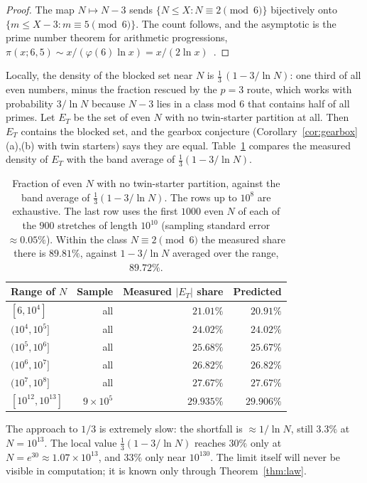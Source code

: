 \documentclass[11pt]{article}
\theoremstyle{definition}
\theoremstyle{remark}
\begin{document}
\begin{proof}
The map $N\mapsto N-3$ sends $\{N\le X:N\equiv2\pmod6\}$ bijectively onto
$\{m\le X-3: m\equiv5\pmod6\}$. The count follows, and the asymptotic is the prime
number theorem for arithmetic progressions,
$\pi(x;6,5)\sim x/(\varphi(6)\ln x)=x/(2\ln x)$~\cite{Davenport}.
\end{proof}

Locally, the density of the blocked set near $N$ is
$\tfrac13\,(1-3/\ln N)$: one third of all even numbers, minus the fraction
rescued by the $p=3$ route, which works with probability $3/\ln N$ because
$N-3$ lies in a class mod $6$ that contains half of all primes. Let $E_T$ be
the set of even $N$ with no twin-starter partition at all. Then $E_T$ contains
the blocked set, and the gearbox conjecture (Corollary~\ref{cor:gearbox}(a),(b) with
twin starters) says they are equal. Table~\ref{tab:law} compares the measured
density of $E_T$ with the band average of $\tfrac13(1-3/\ln N)$.

\begin{table}[ht]
\centering
\begin{tabular}{lrrr}
\toprule
Range of $N$ & Sample & Measured $|E_T|$ share & Predicted \\
\midrule
$[6,10^4]$ & all & $21.01\%$ & $20.91\%$\\
$(10^4,10^5]$ & all & $24.02\%$ & $24.02\%$\\
$(10^5,10^6]$ & all & $25.68\%$ & $25.67\%$\\
$(10^6,10^7]$ & all & $26.82\%$ & $26.82\%$\\
$(10^7,10^8]$ & all & $27.67\%$ & $27.67\%$\\
$[10^{12},10^{13}]$ & $9\times10^5$ & $29.935\%$ & $29.906\%$\\
\bottomrule
\end{tabular}
\caption{Fraction of even $N$ with no twin-starter partition, against the band
average of $\frac13(1-3/\ln N)$. The rows up to $10^8$ are exhaustive. The last row
uses the first $1000$ even $N$ of each of the $900$ stretches of length
$10^{10}$ (sampling standard error $\approx 0.05\%$). Within the class
$N\equiv2\pmod 6$ the measured share there is $89.81\%$, against
$1-3/\ln N$ averaged over the range, $89.72\%$.}
\label{tab:law}
\end{table}

The approach to $1/3$ is extremely slow: the shortfall is $\approx 1/\ln N$,
still $3.3\%$ at $N=10^{13}$. The local value $\tfrac13(1-3/\ln N)$ reaches
$30\%$ only at $N=e^{30}\approx 1.07\times10^{13}$, and $33\%$ only near $10^{130}$.
The limit itself will never be visible in computation; it is known only through
Theorem~\ref{thm:law}.
\end{document}
